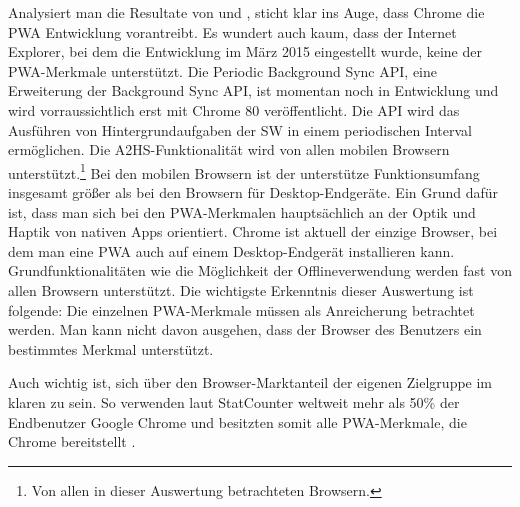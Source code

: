 Analysiert man die Resultate von  und
, sticht klar ins Auge, dass Chrome
die PWA Entwicklung vorantreibt. Es wundert auch kaum, dass der Internet Explorer,
bei dem die Entwicklung im März 2015 eingestellt wurde, \cite{HeiseInternetExplorer} keine der PWA-Merkmale
unterstützt. Die Periodic Background Sync API, eine Erweiterung der Background
Sync API, ist momentan noch in Entwicklung und wird vorraussichtlich erst mit
Chrome 80 veröffentlicht. Die API wird das Ausführen von Hintergrundaufgaben der SW
in einem periodischen Interval ermöglichen.\cite{ChromeStatusPeriodicBackgroundSync}
Die A2HS-Funktionalität wird von allen mobilen Browsern unterstützt.\footnote{Von allen in dieser Auswertung betrachteten Browsern.}
Bei den mobilen Browsern ist der unterstütze Funktionsumfang insgesamt größer als
bei den Browsern für Desktop-Endgeräte. Ein Grund dafür ist, dass man sich bei den PWA-Merkmalen
hauptsächlich an der Optik und Haptik von nativen Apps orientiert. Chrome ist aktuell
der einzige Browser, bei dem man eine PWA auch auf einem Desktop-Endgerät installieren
kann. Grundfunktionalitäten wie  die Möglichkeit der Offlineverwendung werden fast von allen
Browsern unterstützt. Die wichtigste Erkenntnis dieser Auswertung ist folgende: Die einzelnen
PWA-Merkmale müssen als Anreicherung betrachtet werden. Man kann nicht davon ausgehen, dass
der Browser des Benutzers ein bestimmtes Merkmal unterstützt.

Auch wichtig ist, sich über den Browser-Marktanteil der eigenen Zielgruppe im klaren zu sein.
So verwenden laut StatCounter weltweit mehr als 50\% der Endbenutzer Google Chrome und besitzten somit
alle PWA-Merkmale, die Chrome bereitstellt \cite{StatCounterBrowserMarketShare}.

